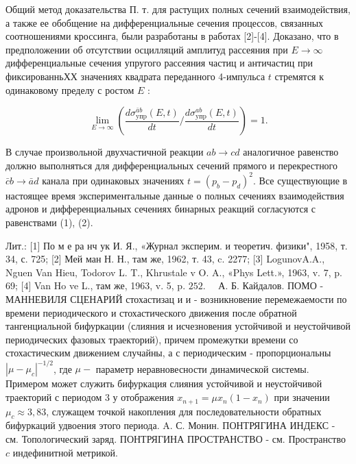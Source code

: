 \documentclass[10pt]{article}
\begin{document}
Общий метод доказательства П. т. для растущих полных сечений взаимодействия, а также ее обобщение на дифференциальные сечения процессов, связанных соотношениями кроссинга, были разработаны в работах [2]-[4]. Доказано, что в предположении об отсутствии осцилляций амплитуд рассеяния при $E \rightarrow \infty$ дифференциальные сечения упругого рассеяния частиц и античастиц при фиксированньХХ значениях квадрата переданного 4-импульса $t$ стремятся к одинаковому пределу с ростом $E$ :



\[

\lim _{E \rightarrow \infty}\left(\frac{d \sigma_{\mathrm{yпp}}^{\bar{a} b}(E, t)}{d t} / \frac{d \sigma_{\mathrm{yпp}}^{a b}(E, t)}{d t}\right)=1 .

\]



В случае произвольной двухчастичной реакции $a b \rightarrow c d$ аналогичное равенство должно выполняться для дифференциальных сечений прямого и перекрестного $\bar{c} b \rightarrow \bar{a} d$ канала при одинаковых значениях $t=\left(p_{b}-p_{d}\right)^{2}$. Все существующие в настоящее время экспериментальные данные о полных сечениях взаимодействия адронов и дифференциальных сечениях бинарных реакщий согласуются с равенствами (1), (2).



Лит.: [1] По м е ра нч ук И. Я., «Журнал эксперим. и теоретич. физики", 1958, т. 34, с. 725; [2] Мей ман Н. Н., там же, 1962, т. 43, c. 2277; [3] LogunovA.A., Nguen Van Hieu, Todorov L. T., Khrustale v O. A., «Phys Lett.», 1963, v. 7, p. 69; [4] Van Ho ve L., там же, 1963, v. 5, p. $252 . \quad$ А. Б. Кайдалов. ПОМО - МАННЕВИЛЯ СЦЕНАРИЙ стохастизац и и - возникновение перемежаемости по времени периодического и стохастического движения после обратной тангенциальной бифуркации (слияния и исчезновения устойчивой и неустойчивой периодических фазовых траекторий), причем промежутки времени со стохастическим движением случайны, а с периодическим - пропорциональны $\left|\mu-\mu_{c}\right|^{-1 / 2}$, где $\mu-$ параметр неравновесности динамической системы. Примером может служить бифуркация слияния устойчивой и неустойчивой траекторий с периодом 3 у отображения $x_{n+1}=\mu x_{n}\left(1-x_{n}\right)$ при значении $\mu_{c} \approx 3,83$, служащем точкой накопления для последовательности обратных бифуркаций удвоения этого периода. A. С. Монин. ПОНТРЯГИНА ИНДЕКС - см. Топологический заряд. ПОНТРЯГИНА ПРОСТРАНСТВО - см. Пространство $c$ индефинитной метрикой.
\end{document}
